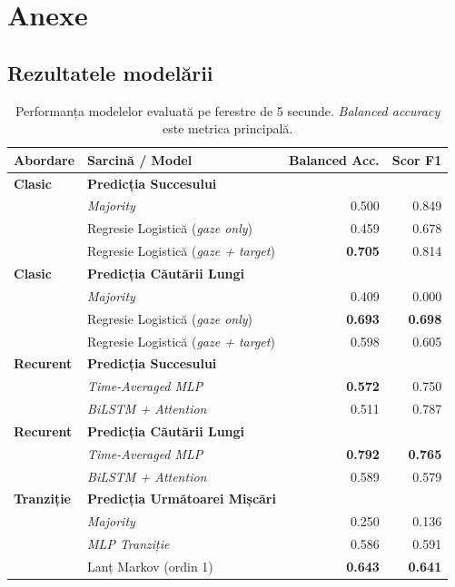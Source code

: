 \appendix
\section{Anexe}

\subsection{Rezultatele modelării}

\begin{table}[H]
	\centering
	\small
	\caption{Performanța modelelor evaluată pe ferestre de 5 secunde. \emph{Balanced accuracy} este metrica principală.}
	\label{tab:predictive-results}
	\begin{tabularx}{\columnwidth}{@{}l>{\raggedright\arraybackslash}Xrr@{}}
		\toprule
		Abordare & Sarcină / Model & Balanced Acc. & Scor F1 \\
		\midrule
		\textbf{Clasic} & \textbf{Predicția Succesului} & & \\
		& \emph{Majority} & 0.500 & 0.849 \\
		& Regresie Logistică (\emph{gaze only}) & 0.459 & 0.678 \\
		& Regresie Logistică (\emph{gaze + target}) & \textbf{0.705} & 0.814 \\
		\midrule
		\textbf{Clasic} & \textbf{Predicția Căutării Lungi} & & \\
		& \emph{Majority} & 0.409 & 0.000 \\
		& Regresie Logistică (\emph{gaze only}) & \textbf{0.693} & \textbf{0.698} \\
		& Regresie Logistică (\emph{gaze + target}) & 0.598 & 0.605 \\
		\midrule
		\textbf{Recurent} & \textbf{Predicția Succesului} & & \\
		& \emph{Time-Averaged MLP} & \textbf{0.572} & 0.750 \\
		& \emph{BiLSTM + Attention} & 0.511 & 0.787 \\
		\midrule
		\textbf{Recurent} & \textbf{Predicția Căutării Lungi} & & \\
		& \emph{Time-Averaged MLP} & \textbf{0.792} & \textbf{0.765} \\
		& \emph{BiLSTM + Attention} & 0.589 & 0.579 \\
		\midrule
		\textbf{Tranziție} & \textbf{Predicția Următoarei Mișcări} & & \\
		& \emph{Majority} & 0.250 & 0.136 \\
		& \emph{MLP Tranziție} & 0.586 & 0.591 \\
		& Lanț Markov (ordin 1) & \textbf{0.643} & \textbf{0.641} \\
		\bottomrule
	\end{tabularx}
\end{table}

